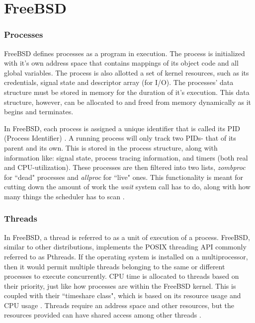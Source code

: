\documentclass[10pt,draftclsnofoot,onecolumn]{IEEEtran}
\begin{document}
\section{FreeBSD}

\subsubsection{Processes}
\label{sub:Process FreeBSD}
\par FreeBSD defines processes as a program in execution.
The process is initialized with it's own address space that contains mappings of its object code and all global variables.
The process is also allotted a set of kernel resources, such as its credentials, signal state and descriptor array (for I/O). \cite{bsd:1}
The processes' data structure must be stored in memory for the duration of it's execution.
This data structure, however, can be allocated to and freed from memory dynamically as it begins and terminates.

\par In FreeBSD, each process is assigned a unique identifier that is called its PID (Process Identifier) \cite{bsd:1}.
A running process will only track two PIDs- that of its parent and its own.
This is stored in the process structure, along with information like: signal state, process tracing information, and timers (both real and CPU-utilization).
These processes are then filtered into two lists, \textit{zombproc} for ``dead" processes and \textit{allproc} for ``live" ones.
This functionality is meant for cutting down the amount of work the \textit{wait} system call has to do, along with how many things the scheduler has to scan \cite{bsd:1}.

\subsubsection{Threads}
\label{sub:Thread FreeBSD}
\par In FreeBSD, a thread is referred to as a unit of execution of a process.
FreeBSD, similar to other distributions, implements the POSIX threading API commonly referred to as Pthreads.
If the operating system is installed on a multiprocessor, then it would permit multiple threads belonging to the same or different processes to execute concurrently.
CPU time is allocated to threads based on their priority, just like how processes are within the FreeBSD kernel.
This is coupled with their ``timeshare class", which is based on its resource usage and CPU usage \cite{bsd:1}.
Threads require an address space and other resources, but the resources provided can have shared access among other threads \cite{bsd:1}.
\end{document}
